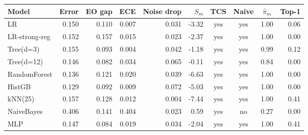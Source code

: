\begin{tabular}{lrrrrrcccr}\toprule
Model & Error & EO gap & ECE & Noise drop & $S_m$ & TCS & Naive & $\hat\pi_m$ & Top-1 \\\midrule
LR & 0.150 & 0.110 & 0.007 & 0.031 & -3.32 & yes & yes & 1.00 & 0.06 \\
LR-strong-reg & 0.152 & 0.157 & 0.015 & 0.023 & -2.37 & yes & yes & 1.00 & 0.00 \\
Tree(d=3) & 0.155 & 0.093 & 0.004 & 0.042 & -1.18 & yes & yes & 0.99 & 0.12 \\
Tree(d=12) & 0.146 & 0.082 & 0.034 & 0.065 & -0.11 & yes & yes & 0.84 & 0.00 \\
RandomForest & 0.136 & 0.121 & 0.020 & 0.039 & -6.63 & yes & yes & 1.00 & 0.00 \\
HistGB & 0.129 & 0.092 & 0.009 & 0.072 & -5.03 & yes & yes & 1.00 & 0.00 \\
kNN(25) & 0.157 & 0.128 & 0.012 & 0.004 & -7.44 & yes & yes & 1.00 & 0.41 \\
NaiveBayes & 0.406 & 0.141 & 0.404 & 0.023 & 0.59 & yes & no & 0.27 & 0.00 \\
MLP & 0.147 & 0.084 & 0.019 & 0.034 & -2.04 & yes & yes & 1.00 & 0.41 \\
\bottomrule\end{tabular}